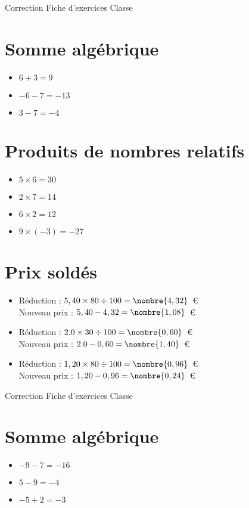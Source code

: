 \documentclass[a4paper,11pt,fleqn]{article}
\begin{document}
\pagestyle{empty}


{Correction} \hfill {\huge Fiche d'exercices } \hfill {Classe}

\section{Somme algébrique}
\begin{itemize}

  \item $6 +3=9$
  \item $-6 -7=-13$
  \item $3 -7=-4$
\end{itemize}

\section{Produits de nombres relatifs}
\begin{itemize}

  \item $5\times6=30$
  \item $2\times7=14$
  \item $6\times2=12$
  \item $9\times(-3)=-27$
\end{itemize}

\section{Prix soldés}
\begin{itemize}

  \item Réduction : $5,40\times80\div100=\nombre{4,32}$~€\\
  Nouveau prix : $5,40-4,32=\nombre{1,08}$~€
  \item Réduction : $2.0\times30\div100=\nombre{0,60}$~€\\
  Nouveau prix : $2.0-0,60=\nombre{1,40}$~€
  \item Réduction : $1,20\times80\div100=\nombre{0,96}$~€\\
  Nouveau prix : $1,20-0,96=\nombre{0,24}$~€
\end{itemize}
\newpage
\setcounter{exo}{0}
\setcounter{section}{0}
{Correction} \hfill {\huge Fiche d'exercices } \hfill {Classe}

\section{Somme algébrique}
\begin{itemize}

  \item $-9 -7=-16$
  \item $5 -9=-4$
  \item $-5 +2=-3$
\end{itemize}
\end{document}
